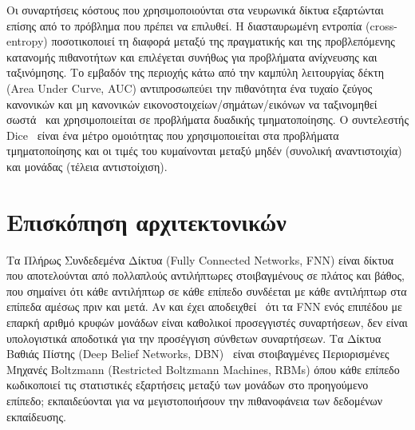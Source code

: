 Οι συναρτήσεις κόστους που χρησιμοποιούνται στα νευρωνικά δίκτυα εξαρτώνται επίσης από το πρόβλημα που πρέπει να επιλυθεί.
Η διασταυρωμένη εντροπία (cross-entropy) ποσοτικοποιεί τη διαφορά μεταξύ της πραγματικής και της προβλεπόμενης κατανομής πιθανοτήτων και επιλέγεται συνήθως για προβλήματα ανίχνευσης και ταξινόμησης.
Το εμβαδόν της περιοχής κάτω από την καμπύλη λειτουργίας δέκτη (Area Under Curve, AUC) αντιπροσωπεύει την πιθανότητα ένα τυχαίο ζεύγος κανονικών και μη κανονικών εικονοστοιχείων/σημάτων/εικόνων να ταξινομηθεί σωστά~\cite{hanley1982meaning} και χρησιμοποιείται σε προβλήματα δυαδικής τμηματοποίησης.
Ο συντελεστής Dice~\cite{dice1945measures} είναι ένα μέτρο ομοιότητας που χρησιμοποιείται στα προβλήματα τμηματοποίησης και οι τιμές του κυμαίνονται μεταξύ μηδέν (συνολική αναντιστοιχία) και μονάδας (τέλεια αντιστοίχιση).

\section{Επισκόπηση αρχιτεκτονικών}
Τα Πλήρως Συνδεδεμένα Δίκτυα (Fully Connected Networks, FNN) είναι δίκτυα που αποτελούνται από πολλαπλούς αντιλήπτωρες στοιβαγμένους σε πλάτος και βάθος, που σημαίνει ότι κάθε αντιλήπτωρ σε κάθε επίπεδο συνδέεται με κάθε αντιλήπτωρ στα επίπεδα αμέσως πριν και μετά.
Αν και έχει αποδειχθεί~\cite{hornik1989multilayer} ότι τα FNN ενός επιπέδου με επαρκή αριθμό κρυφών μονάδων είναι καθολικοί προσεγγιστές συναρτήσεων, δεν είναι υπολογιστικά αποδοτικά για την προσέγγιση σύνθετων συναρτήσεων.
Τα Δίκτυα Βαθιάς Πίστης (Deep Belief Networks, DBN)~\cite{hinton2006fast} είναι στοιβαγμένες Περιορισμένες Μηχανές Boltzmann (Restricted Boltzmann Machines, RBMs) όπου κάθε επίπεδο κωδικοποιεί τις στατιστικές εξαρτήσεις μεταξύ των μονάδων στο προηγούμενο επίπεδο; εκπαιδεύονται για να μεγιστοποιήσουν την πιθανοφάνεια των δεδομένων εκπαίδευσης.

